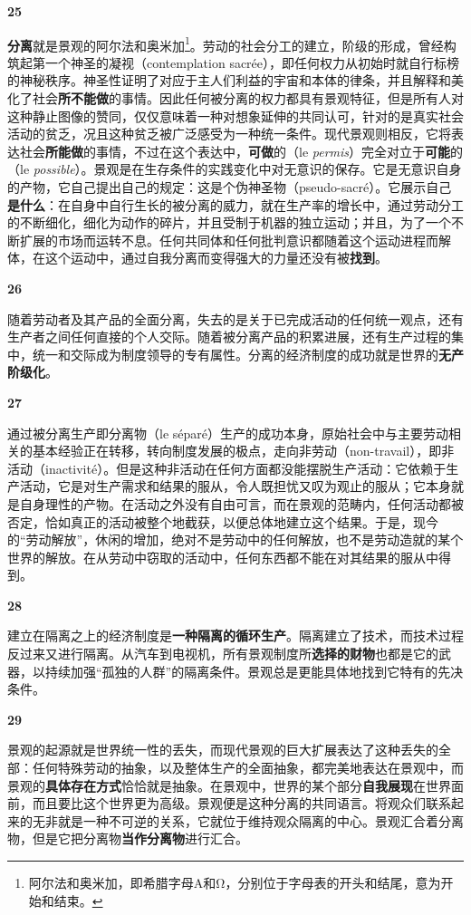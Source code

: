\documentclass[fontset=fandol, a4paper, 12pt, openright]{ctexbook}
\makeatletter
\newcommand{\thesis}[1]{%
    \par\vspace{1.5em}%
    {\centering \textbf{\Large #1}\par}%
    \nobreak\vspace{0.5em}\nobreak
    \@afterindenttrue %
    \@afterheading    %
}
\makeatother
\begin{document}
\thesis{25}
\textbf{分离}就是景观的阿尔法和奥米加\footnote{阿尔法和奥米加，即希腊字母Α和Ω，分别位于字母表的开头和结尾，意为开始和结束。}。劳动的社会分工的建立，阶级的形成，曾经构筑起第一个神圣的凝视（contemplation sacrée），即任何权力从初始时就自行标榜的神秘秩序。神圣性证明了对应于主人们利益的宇宙和本体的律条，并且解释和美化了社会\textbf{所不能做}的事情。因此任何被分离的权力都具有景观特征，但是所有人对这种静止图像的赞同，仅仅意味着一种对想象延伸的共同认可，针对的是真实社会活动的贫乏，况且这种贫乏被广泛感受为一种统一条件。现代景观则相反，它将表达社会\textbf{所能做}的事情，不过在这个表达中，\textbf{可做}的（le \textit{permis}）完全对立于\textbf{可能}的（le \textit{possible}）。景观是在生存条件的实践变化中对无意识的保存。它是无意识自身的产物，它自己提出自己的规定：这是个伪神圣物（pseudo-sacré）。它展示自己\textbf{是什么}：在自身中自行生长的被分离的威力，就在生产率的增长中，通过劳动分工的不断细化，细化为动作的碎片，并且受制于机器的独立运动；并且，为了一个不断扩展的市场而运转不息。任何共同体和任何批判意识都随着这个运动进程而解体，在这个运动中，通过自我分离而变得强大的力量还没有被\textbf{找到}。

\thesis{26}
随着劳动者及其产品的全面分离，失去的是关于已完成活动的任何统一观点，还有生产者之间任何直接的个人交际。随着被分离产品的积累进展，还有生产过程的集中，统一和交际成为制度领导的专有属性。分离的经济制度的成功就是世界的\textbf{无产阶级化}。

\thesis{27}
通过被分离生产即分离物（le séparé）生产的成功本身，原始社会中与主要劳动相关的基本经验正在转移，转向制度发展的极点，走向非劳动（non-travail），即非活动（inactivité）。但是这种非活动在任何方面都没能摆脱生产活动：它依赖于生产活动，它是对生产需求和结果的服从，令人既担忧又叹为观止的服从；它本身就是自身理性的产物。在活动之外没有自由可言，而在景观的范畴内，任何活动都被否定，恰如真正的活动被整个地截获，以便总体地建立这个结果。于是，现今的“劳动解放”，休闲的增加，绝对不是劳动中的任何解放，也不是劳动造就的某个世界的解放。在从劳动中窃取的活动中，任何东西都不能在对其结果的服从中得到。

\thesis{28}
建立在隔离之上的经济制度是\textbf{一种隔离的循环生产}。隔离建立了技术，而技术过程反过来又进行隔离。从汽车到电视机，所有景观制度所\textbf{选择的财物}也都是它的武器，以持续加强“孤独的人群”的隔离条件。景观总是更能具体地找到它特有的先决条件。

\thesis{29}
景观的起源就是世界统一性的丢失，而现代景观的巨大扩展表达了这种丢失的全部：任何特殊劳动的抽象，以及整体生产的全面抽象，都完美地表达在景观中，而景观的\textbf{具体存在方式}恰恰就是抽象。在景观中，世界的某个部分\textbf{自我展现}在世界面前，而且要比这个世界更为高级。景观便是这种分离的共同语言。将观众们联系起来的无非就是一种不可逆的关系，它就位于维持观众隔离的中心。景观汇合着分离物，但是它把分离物\textbf{当作分离物}进行汇合。
\end{document}
